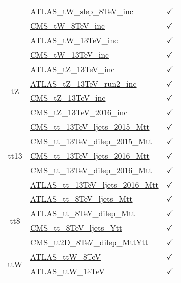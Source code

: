 \documentclass{article}
\begin{document}
\begin{table}[H]
\begin{tabular}{|c|l|c|}
 & \href{https://arxiv.org/abs/2007.01554}{ATLAS_tW_slep_8TeV_inc}  & $\checkmark$\\ \cline{2-3}
 & \href{https://arxiv.org/abs/1401.2942}{CMS_tW_8TeV_inc}  & $\checkmark$\\ \cline{2-3}
 & \href{https://arxiv.org/abs/1612.07231}{ATLAS_tW_13TeV_inc}  & $\checkmark$\\ \cline{2-3}
 & \href{https://arxiv.org/abs/1805.07399}{CMS_tW_13TeV_inc}  & $\checkmark$
\\ \hline
\multirow{4}{*}{tZ}
 & \href{https://arxiv.org/abs/1712.02825}{ATLAS_tZ_13TeV_inc}  & $\checkmark$\\ \cline{2-3}
 & \href{https://arxiv.org/abs/2002.07546}{ATLAS_tZ_13TeV_run2_inc}  & $\checkmark$\\ \cline{2-3}
 & \href{https://arxiv.org/abs/1712.02825}{CMS_tZ_13TeV_inc}  & $\checkmark$\\ \cline{2-3}
 & \href{https://arxiv.org/abs/1812.05900}{CMS_tZ_13TeV_2016_inc}  & $\checkmark$
\\ \hline
\multirow{5}{*}{tt13}
 & \href{https://arxiv.org/abs/1610.04191}{CMS_tt_13TeV_ljets_2015_Mtt}  & $\checkmark$\\ \cline{2-3}
 & \href{https://arxiv.org/abs/1708.07638}{CMS_tt_13TeV_dilep_2015_Mtt}  & $\checkmark$\\ \cline{2-3}
 & \href{https://arxiv.org/abs/1803.08856}{CMS_tt_13TeV_ljets_2016_Mtt}  & $\checkmark$\\ \cline{2-3}
 & \href{https://arxiv.org/abs/1811.06625}{CMS_tt_13TeV_dilep_2016_Mtt}  & $\checkmark$\\ \cline{2-3}
 & \href{https://arxiv.org/abs/1908.07305}{ATLAS_tt_13TeV_ljets_2016_Mtt}  & $\checkmark$
\\ \hline
\multirow{4}{*}{tt8}
 & \href{https://arxiv.org/abs/1511.04716}{ATLAS_tt_8TeV_ljets_Mtt}  & $\checkmark$\\ \cline{2-3}
 & \href{https://arxiv.org/abs/1607.07281}{ATLAS_tt_8TeV_dilep_Mtt}  & $\checkmark$\\ \cline{2-3}
 & \href{https://arxiv.org/abs/1505.04480}{CMS_tt_8TeV_ljets_Ytt}  & $\checkmark$\\ \cline{2-3}
 & \href{https://arxiv.org/abs/1703.01630}{CMS_tt2D_8TeV_dilep_MttYtt}  & $\checkmark$
\\ \hline
\multirow{5}{*}{ttW}
 & \href{https://arxiv.org/abs/1509.05276}{ATLAS_ttW_8TeV}  & $\checkmark$\\ \cline{2-3}
 & \href{https://arxiv.org/abs/1609.01599}{ATLAS_ttW_13TeV}  & $\checkmark$\\ \cline{2-3}

\end{tabular}
\end{table}
\end{document}
